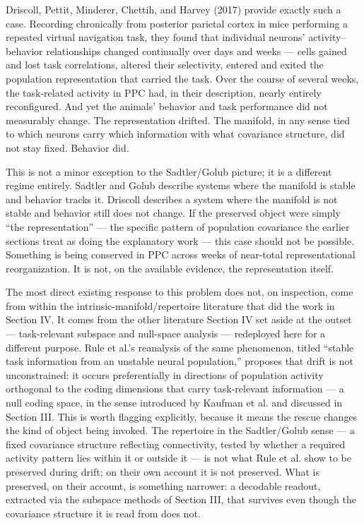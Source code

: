 \documentclass[11pt]{article}
\begin{document}
Driscoll, Pettit, Minderer, Chettih, and Harvey (2017) provide exactly such a case. Recording chronically from posterior parietal cortex in mice performing a repeated virtual navigation task, they found that individual neurons' activity–behavior relationships changed continually over days and weeks — cells gained and lost task correlations, altered their selectivity, entered and exited the population representation that carried the task. Over the course of several weeks, the task-related activity in PPC had, in their description, nearly entirely reconfigured. And yet the animals' behavior and task performance did not measurably change. The representation drifted. The manifold, in any sense tied to which neurons carry which information with what covariance structure, did not stay fixed. Behavior did.

This is not a minor exception to the Sadtler/Golub picture; it is a different regime entirely. Sadtler and Golub describe systems where the manifold is stable and behavior tracks it. Driscoll describes a system where the manifold is not stable and behavior still does not change. If the preserved object were simply ``the representation'' — the specific pattern of population covariance the earlier sections treat as doing the explanatory work — this case should not be possible. Something is being conserved in PPC across weeks of near-total representational reorganization. It is not, on the available evidence, the representation itself.

The most direct existing response to this problem does not, on inspection, come from within the intrinsic-manifold/repertoire literature that did the work in Section IV. It comes from the other literature Section IV set aside at the outset — task-relevant subspace and null-space analysis — redeployed here for a different purpose. Rule et al.'s reanalysis of the same phenomenon, titled ``stable task information from an unstable neural population,'' proposes that drift is not unconstrained: it occurs preferentially in directions of population activity orthogonal to the coding dimensions that carry task-relevant information — a null coding space, in the sense introduced by Kaufman et al. and discussed in Section III. This is worth flagging explicitly, because it means the rescue changes the kind of object being invoked. The repertoire in the Sadtler/Golub sense — a fixed covariance structure reflecting connectivity, tested by whether a required activity pattern lies within it or outside it — is not what Rule et al. show to be preserved during drift; on their own account it is not preserved. What is preserved, on their account, is something narrower: a decodable readout, extracted via the subspace methods of Section III, that survives even though the covariance structure it is read from does not.
\end{document}
